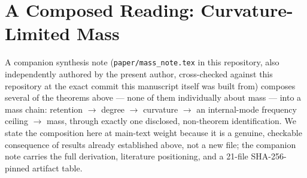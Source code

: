 \documentclass[10pt,twocolumn]{article}
\begin{document}
\section{A Composed Reading: Curvature-Limited Mass}
\label{sec:masschain}
A companion synthesis note (\texttt{paper/mass\_note.tex} in this repository,
also independently authored by the present author, cross-checked against this
repository at the exact commit this manuscript itself was built from) composes
several of the theorems above --- none of them individually about mass --- into
a mass chain: retention $\to$ degree $\to$ curvature $\to$ an internal-mode
frequency ceiling $\to$ mass, through exactly one disclosed, non-theorem
identification. We state the composition here at main-text weight because it
is a genuine, checkable consequence of results already established above, not
a new file; the companion note carries the full derivation, literature
positioning, and a 21-file SHA-256-pinned artifact table.
\end{document}
